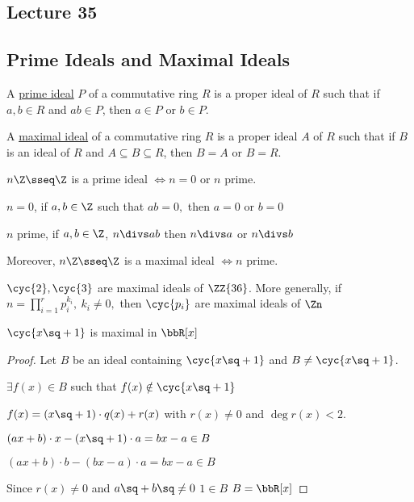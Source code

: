\subsection*{Lecture 35} %
\subsection{Prime Ideals and Maximal Ideals}
\begin{definition}
  A \ul{prime ideal} \( P \) of a commutative ring \( R \) is a proper ideal of \( R \) such that if \( a,b\in R \) and \( ab\in P \), then \( a\in P \) or \( b\in P \).

  A \ul{maximal ideal} of a commutative ring \( R \) is a proper ideal \( A \) of \( R \) such that if \( B \) is an ideal of \( R \) and \( A\subseteq B\subseteq R \), then \( B=A \) or \( B=R \).
\end{definition}

\begin{example}
  \( n\Z \sseq \Z \) is a prime ideal \( \iff n=0 \) or \( n \) prime.

  \begin{note}
    \( n = 0 \), if \( a,b\in \Z \) such that \( ab = 0, \) then \( a=0 \) or \( b=0 \) \checkmark

    \( n \) prime, if \( a,b\in\Z \), \( n\divs ab \) then \( n\divs a  \) or \( n\divs b \) \checkmark
  \end{note}
  Moreover, \( n\Z\sseq\Z \) is a maximal ideal \( \iff n \) prime.
\end{example}

\begin{example}
  \( \cyc{2}, \cyc{3} \) are maximal ideals of \( \ZZ{36} \). More generally, if \( n=\prod_{i=1}^{r} p_{i}^{k_{i}},\ k_i\neq 0,\) then \( \cyc{p_i} \) are maximal ideals of \( \Zn \)
\end{example}

\begin{example}
  \( \cyc{x\sq +1} \) is maximal in \( \bbR[x] \)
\end{example}

\begin{proof}
  Let \( B \) be an ideal containing \( \cyc{x\sq + 1} \) and \( B\neq \cyc{x\sq + 1} \).

  \imp \( \exists f(x) \in B \) such that \( f(x) \notin \cyc{x\sq + 1} \)

  \imp \( f(x) = (x\sq+1) \cdot q(x) + r(x) \) with \( r(x)\neq 0 \) and \( \deg r(x) <2 \).

  \imp \( (ax+b) \cdot x - (x\sq+1)\cdot a = bx-a \in B \)

  \imp \( (ax+b) \cdot b - (bx-a)\cdot a = bx-a \in B \)

  Since \( r(x) \neq 0 \) and \( a\sq+b\sq \neq 0 \) \imp \( 1\in B \) \imp \( B = \bbR[x] \)
\end{proof}

